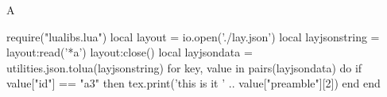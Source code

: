 \documentclass[a3paper]{article}
\begin{document}
A
\begin{luacode}
  require("lualibs.lua")
  local layout = io.open('./lay.json')
  local layjsonstring = layout:read('*a')
  layout:close()
  local layjsondata =  utilities.json.tolua(layjsonstring)
  for key, value in pairs(layjsondata) do
    if value["id"] == "a3" then 
        tex.print('this is it ' .. value["preamble"][2])
    end
  end
\end{luacode}
% 
% 
%  
\end{document}
